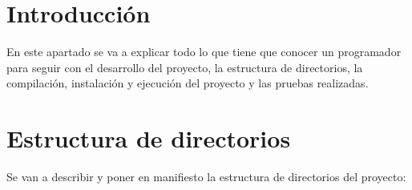 
\section{Introducción}

En este apartado se va a explicar todo lo que tiene que conocer un programador para seguir con el desarrollo del proyecto, la estructura de directorios, la compilación, instalación y ejecución del proyecto y las pruebas realizadas.

\section{Estructura de directorios}

Se van a describir y poner en manifiesto la estructura de directorios del proyecto:

